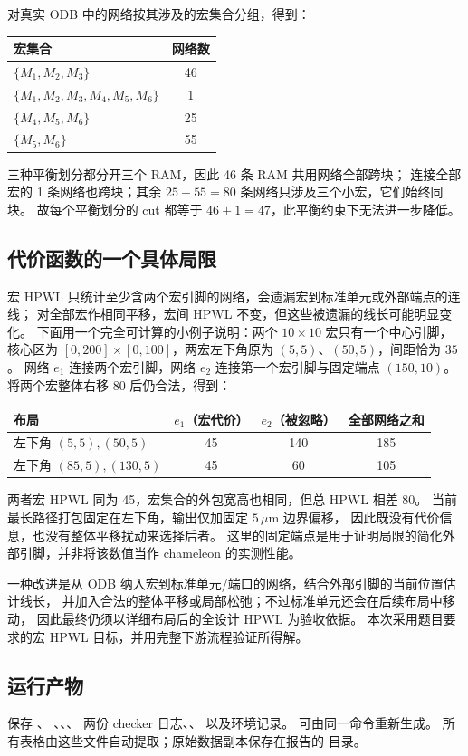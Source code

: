对真实 ODB 中的网络按其涉及的宏集合分组，得到：
\begin{center}
\begin{tabular}{lc}
\toprule 宏集合 & 网络数 \\\midrule
$\{M_{1},M_{2},M_{3}\}$ & 46 \\
$\{M_{1},M_{2},M_{3},M_{4},M_{5},M_{6}\}$ & 1 \\
$\{M_{4},M_{5},M_{6}\}$ & 25 \\
$\{M_{5},M_{6}\}$ & 55 \\
\bottomrule
\end{tabular}
\end{center}
三种平衡划分都分开三个 RAM，因此 46 条 RAM 共用网络全部跨块；
连接全部宏的 1 条网络也跨块；其余 $25+55=80$ 条网络只涉及三个小宏，它们始终同块。
故每个平衡划分的 cut 都等于 $46+1=47$，此平衡约束下无法进一步降低。

\clearpage
\subsection{代价函数的一个具体局限}
宏 HPWL 只统计至少含两个宏引脚的网络，会遗漏宏到标准单元或外部端点的连线；
对全部宏作相同平移，宏间 HPWL 不变，但这些被遗漏的线长可能明显变化。
下面用一个完全可计算的小例子说明：两个 $10\times10$ 宏只有一个中心引脚，
核心区为 $[0,200]\times[0,100]$，两宏左下角原为 $(5,5)$、$(50,5)$，间距恰为 $35$。
网络 $e_1$ 连接两个宏引脚，网络 $e_2$ 连接第一个宏引脚与固定端点 $(150,10)$。
将两个宏整体右移 80 后仍合法，得到：
\begin{center}
\begin{tabular}{lccc}
\toprule 布局 & $e_1$（宏代价） & $e_2$（被忽略） & 全部网络之和 \\\midrule
左下角 $(5,5),(50,5)$ & 45 & 140 & 185 \\
左下角 $(85,5),(130,5)$ & 45 & 60 & 105 \\\bottomrule
\end{tabular}
\end{center}
两者宏 HPWL 同为 45，宏集合的外包宽高也相同，但总 HPWL 相差 80。
当前最长路径打包固定在左下角，输出仅加固定 $5\,\mu$m 边界偏移，
因此既没有代价信息，也没有整体平移扰动来选择后者。
这里的固定端点是用于证明局限的简化外部引脚，并非将该数值当作 chameleon 的实测性能。

一种改进是从 ODB 纳入宏到标准单元/端口的网络，结合外部引脚的当前位置估计线长，
并加入合法的整体平移或局部松弛；不过标准单元还会在后续布局中移动，
因此最终仍须以详细布局后的全设计 HPWL 为验收依据。
本次采用题目要求的宏 HPWL 目标，并用完整下游流程验证所得解。

\subsection{运行产物}
 保存 、
、、、
两份 checker 日志、、 以及环境记录。
 可由同一命令重新生成。
所有表格由这些文件自动提取；原始数据副本保存在报告的  目录。
